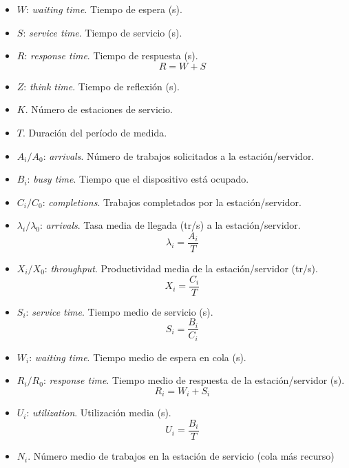 \documentclass[12pt,spanish]{article}
\begin{document}
\begin{itemize}
	\item $W$: \textit{waiting time}. Tiempo de espera (s).
	\item $S$: \textit{service time}. Tiempo de servicio (s).
	\item $R$: \textit{response time}. Tiempo de respuesta (s).
		\begin{equation*}
			R = W + S
		\end{equation*}
	\item $Z$: \textit{think time}. Tiempo de reflexión (s).
	\item $K$. Número de estaciones de servicio.
	\item $T$. Duración del período de medida.
	\item $A_i/A_0$: \textit{arrivals}. Número de trabajos solicitados a la estación/servidor.
	\item $B_i$: \textit{busy time}. Tiempo que el dispositivo está ocupado.
	\item $C_i/C_0$: \textit{completions}. Trabajos completados por la estación/servidor.
	\item $\lambda_i/\lambda_0$: \textit{arrivals}. Tasa media de llegada (tr/s) a la estación/servidor.
		\begin{equation*}
			\lambda_i=\frac{A_i}{T}
		\end{equation*}
	\item $X_i/X_0$: \textit{throughput}. Productividad media de la estación/servidor (tr/s).
		\begin{equation*}
			X_i=\frac{C_i}{T}
		\end{equation*}
	\item $S_i$: \textit{service time}. Tiempo medio de servicio (s).
		\begin{equation*}
			S_i=\frac{B_i}{C_i}
		\end{equation*}
	\item $W_i$: \textit{waiting time}. Tiempo medio de espera en cola (s).
	\item $R_i/R_0$: \textit{response time}. Tiempo medio de respuesta de la estación/servidor (s).
		\begin{equation*}
			R_i=W_i + S_i
		\end{equation*}
	\item $U_i$: \textit{utilization}. Utilización media (s).
		\begin{equation*}
			U_i=\frac{B_i}{T}
		\end{equation*}
	\item $N_i$. Número medio de trabajos en la estación de servicio (cola más recurso)

\end{itemize}
\end{document}
